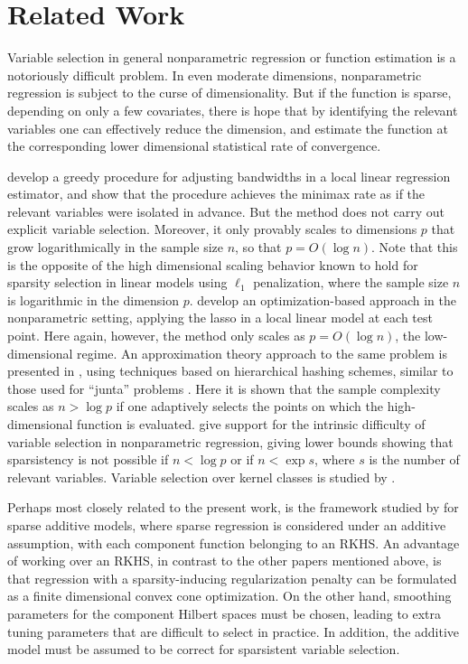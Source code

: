 \section{Related Work}

Variable selection in general nonparametric regression or function
estimation is a notoriously difficult problem.  In even moderate
dimensions, nonparametric regression is subject to the curse
of dimensionality.  But if the function is sparse, depending
on only a few covariates, there is hope that by identifying
the relevant variables one can effectively reduce the 
dimension, and  estimate the function at the
corresponding lower dimensional statistical rate of convergence.

\citet{lafferty2008rodeo} develop a greedy procedure for
adjusting bandwidths in a local linear regression estimator,
and show that the procedure achieves the minimax rate
as if the relevant variables were isolated in advance.
But the method does not carry out explicit variable selection.
Moreover, it only provably scales to dimensions $p$ that 
grow logarithmically in the sample size $n$, so that $p = O(\log n)$.  Note that this
is the opposite of the high dimensional scaling behavior
known to hold for sparsity selection in linear models
using $\ell_1$ penalization, where the sample size $n$
is logarithmic in the dimension $p$. \citet{bertin:08}
develop an optimization-based approach in
the nonparametric setting, applying the lasso
in a local linear model at each test point.  Here again,
however, the method only scales as $p = O(\log n)$,
the low-dimensional regime.
An approximation theory approach to the same
problem is presented in \cite{devore:11}, 
using techniques based on hierarchical hashing schemes,
similar to those used for ``junta'' problems \cite{mossel:04}.
Here it is shown that the sample complexity scales as $n > \log p$ 
if one adaptively selects the points on
which the high-dimensional function is evaluated.
\citet{dalalyan:12} give
support for the intrinsic difficulty of variable
selection in nonparametric regression, giving lower bounds 
showing that sparsistency is not possible if $n < \log p$ or if $n <
\exp s$, where $s$ is the number of relevant variables.
Variable selection over kernel classes is studied
by \citet{Kolch:10}.  

Perhaps most closely related to the present work, is the framework
studied by \cite{Raskutti:12} for sparse additive models, where sparse
regression is considered under an additive assumption, with each
component function belonging to an RKHS.  An advantage of working over
an RKHS, in contrast to the other papers mentioned above, is that
regression with a sparsity-inducing regularization penalty can be
formulated as a finite dimensional convex cone optimization.
On the other hand, 
smoothing parameters for the component Hilbert spaces
must be chosen, leading to extra tuning parameters
that are difficult to select in practice.  In addition, 
the additive model must be assumed to
be correct for sparsistent variable selection.

